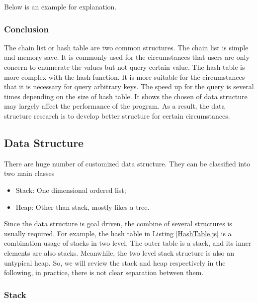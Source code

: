 Below is an example for explanation.



\subsubsection{Conclusion}

The chain list or hash table are two common structures.
The chain list is simple and memory save.
It is commonly used for the circumstances that users are only concern to enumerate the values but not query certain value.
The hash table is more complex with the hash function.
It is more suitable for the circumstances that it is necessary for query arbitrary keys.
The speed up for the query is several times depending on the size of hash table.
It shows the chosen of data structure may largely affect the performance of the program.
As a result, the data structure research is to develop better structure for certain circumstances.

\subsection{Data Structure}

There are huge number of customized data structure.
They can be classified into two main classes
\begin{itemize}
    \item Stack: One dimensional ordered list;
    \item Heap: Other than stack, mostly likes a tree.
\end{itemize}
Since the data structure is goal driven, the combine of several structures is usually required.
For example, the hash table in Listing \ref{HashTable.js} is a combination usage of stacks in two level.
The outer table is a stack, and its inner elements are also stacks.
Meanwhile, the two level stack structure is also an untypical heap.
So, we will review the stack and heap respectively in the following,
in practice, there is not clear separation between them.

\subsubsection{Stack}


